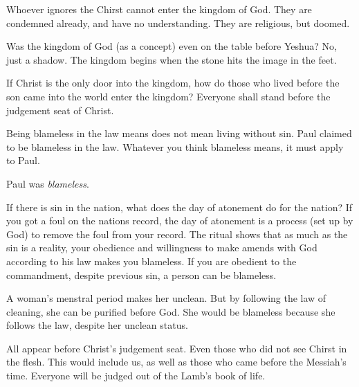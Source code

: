 \documentclass[12pt]{article}
\begin{document}
	Whoever ignores the Chirst cannot enter the kingdom of God.
	They are condemned already, and have no understanding. They
	are religious, but doomed.

	Was the kingdom of God (as a concept) even on the table before
	Yeshua? No, just a shadow. The kingdom begins when the stone
	hits the image in the feet.

	If Christ is the only door into the kingdom, how do those who
	lived before the son came into the world enter the kingdom?
	Everyone shall stand before the judgement seat of Christ.
	
	Being blameless in the law means does not mean living without
	sin. Paul claimed to be blameless in the law. Whatever you think
	blameless means, it must apply to Paul.

	\begin{quote}
		\BiblePhilippiansThreeTwo{}
		\BiblePhilippiansThreeThree{}
		\BiblePhilippiansThreeFour{}
		\BiblePhilippiansThreeFive{}
		\BiblePhilippiansThreeSix{}
	\end{quote}

	Paul was \textit{blameless}.

	\begin{quote}
		\BibleRomansSevenSeven{}
		\BibleRomansSevenEight{}
		\BibleRomansSevenNine{}
		\BibleRomansSevenTen{}
	\end{quote}

	If there is sin in the nation, what does the day of atonement
	do for the nation? If you got a foul on the nations record,
	the day of atonement is a process (set up by God) to remove the
	foul from your record. The ritual shows that as much as the sin
	is a reality, your obedience and willingness to make amends
	with God according to his law makes you blameless. If you are
	obedient to the commandment, despite previous sin, a person
	can be blameless.

	A woman's menstral period makes her unclean. But by following
	the law of cleaning, she can be purified before God. She
	would be blameless because she follows the law, despite her
	unclean status.

	\begin{quote}
		\BibleSecondCorinthiansFiveNine{}
		\BibleSecondCorinthiansFiveTen{}
	\end{quote}

	All appear before Christ's judgement seat. Even those who did
	not see Chirst in the flesh. This would include us, as well as
	those who came before the Messiah's time. Everyone will be
	judged out of the Lamb's book of life.
\end{document}

